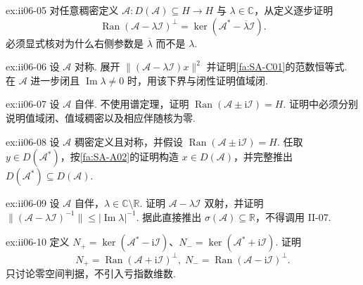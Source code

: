 \begin{FAExercise}[值域正交补与伴随核]{ex:ii06-05}
对任意稠密定义 \(\displaystyle\mathcal A:D(\mathcal A)\subseteq H\to H\) 与 \(\displaystyle\lambda\in\mathbb C\)，从定义逐步证明
\[
\operatorname{Ran}(\mathcal A-\lambda\mathcal I)^\perp
=
\ker(\mathcal A^*-\overline\lambda\mathcal I).
\]
必须显式核对为什么右侧参数是 \(\displaystyle\overline\lambda\) 而不是 \(\displaystyle\lambda\).
\end{FAExercise}

\begin{FAExercise}[非实参数下界与闭值域]{ex:ii06-06}
设 \(\displaystyle\mathcal A\) 对称. 展开 \(\displaystyle\|(\mathcal A-\lambda\mathcal I)x\|^2\) 并证明\autoref{fa:SA-C01}的范数恒等式. 在 \(\displaystyle\mathcal A\) 进一步闭且 \(\displaystyle\operatorname{Im}\lambda\neq0\) 时，用该下界与闭性证明值域闭.
\end{FAExercise}

\begin{FAExercise}[自伴性的非实值域判据：正向]{ex:ii06-07}
设 \(\displaystyle\mathcal A\) 自伴. 不使用谱定理，证明 \(\displaystyle\operatorname{Ran}(\mathcal A\pm\mathrm{i}\mathcal I)=H\). 证明中必须分别说明值域闭、值域稠密以及相应伴随核为零.
\end{FAExercise}

\begin{FAExercise}[自伴性的非实值域判据：反向]{ex:ii06-08}
设 \(\displaystyle\mathcal A\) 稠密定义且对称，并假设 \(\displaystyle\operatorname{Ran}(\mathcal A\pm\mathrm{i}\mathcal I)=H\). 任取 \(\displaystyle y\in D(\mathcal A^*)\)，按\autoref{fa:SA-A02}的证明构造 \(\displaystyle x\in D(\mathcal A)\)，并完整推出 \(\displaystyle D(\mathcal A^*)\subseteq D(\mathcal A)\).
\end{FAExercise}

\begin{FAExercise}[非实预解估计]{ex:ii06-09}
设 \(\displaystyle\mathcal A\) 自伴，\(\displaystyle\lambda\in\mathbb C\setminus\mathbb R\). 证明 \(\displaystyle\mathcal A-\lambda\mathcal I\) 双射，并证明
\(\displaystyle \|(\mathcal A-\lambda\mathcal I)^{-1}\| \leqslant |\operatorname{Im}\lambda|^{-1}.\)
据此直接推出 \(\displaystyle\sigma(\mathcal A)\subseteq\mathbb R\)，不得调用 II-07.
\end{FAExercise}

\begin{FAExercise}[亏子空间的符号审计]{ex:ii06-10}
定义 \(\displaystyle N_+=\ker(\mathcal A^*-\mathrm{i}\mathcal I)\)、\(\displaystyle N_-=\ker(\mathcal A^*+\mathrm{i}\mathcal I)\). 证明
\[
N_+
=
\operatorname{Ran}(\mathcal A+\mathrm{i}\mathcal I)^\perp,
\;
N_-
=
\operatorname{Ran}(\mathcal A-\mathrm{i}\mathcal I)^\perp.
\]
只讨论零空间判据，不引入亏指数维数.
\end{FAExercise}

